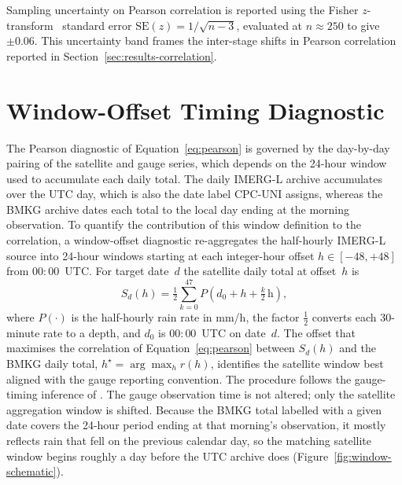 Sampling uncertainty on Pearson correlation is reported using
the Fisher $z$-transform~\citep{ref:wilks2020} standard error
$\text{SE}(z) = 1/\sqrt{n - 3}$, evaluated at $n \approx 250$ to
give $\pm 0.06$. This uncertainty band frames the inter-stage
shifts in Pearson correlation reported in
Section~\ref{sec:results-correlation}.


\section{Window-Offset Timing Diagnostic}\label{sec:methods-window}

The Pearson diagnostic of Equation~\ref{eq:pearson} is governed by
the day-by-day pairing of the satellite and gauge series, which
depends on the 24-hour window used to accumulate each daily total.
The daily IMERG-L archive accumulates over the UTC day, which is
also the date label CPC-UNI assigns, whereas the BMKG archive
dates each total to the local day ending at the morning
observation. To quantify the contribution of this
window definition to the correlation, a window-offset diagnostic
re-aggregates the half-hourly IMERG-L source \citep{ref:imerghhl07}
into 24-hour windows starting at each integer-hour offset
$h \in [-48, +48]$ from $00{:}00$~UTC. For target date~$d$ the
satellite daily total at offset~$h$ is
\begin{equation}
S_d(h) = \tfrac{1}{2}\sum_{k=0}^{47}
         P\!\left(d_0 + h + \tfrac{k}{2}\,\text{h}\right),
\label{eq:window}
\end{equation}
where $P(\cdot)$ is the half-hourly rain rate in mm/h, the factor
$\tfrac{1}{2}$ converts each 30-minute rate to a depth, and $d_0$
is $00{:}00$~UTC on date~$d$. The offset that maximises the
correlation of Equation~\ref{eq:pearson} between $S_d(h)$ and the
BMKG daily total, $h^{\star} = \arg\max_h r(h)$, identifies the
satellite window best aligned with the gauge reporting convention.
The procedure follows the gauge-timing inference of
\citet{ref:beck2019}. The gauge observation time is not altered; only
the satellite aggregation window is shifted. Because the BMKG total
labelled with a given date covers the 24-hour period ending at that
morning's observation, it mostly reflects rain that fell on the
previous calendar day, so the matching satellite window begins
roughly a day before the UTC archive does
(Figure~\ref{fig:window-schematic}).

